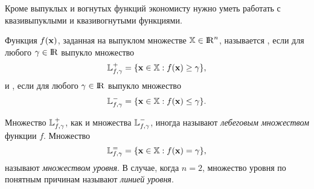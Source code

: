     Кроме выпуклых и вогнутых функций экономисту нужно уметь работать с квазивыпуклыми и
    квазивогнутыми функциями.


\begin{dfn}
 Функция $f(\mathbf{x})$, заданная на выпуклом множестве $\mathbb{X} \in
  {\rm I\!R}^n$, называется ,
  если для любого $\gamma \in {\rm I\!R}$ выпукло множество
\[
    \mathbb{L}^{+}_{f,\gamma}=\{ \mathbf{x}\in\mathbb{X}: f(\mathbf{x}) \geq \gamma\},
\]
    и ,
  если для любого $\gamma \in {\rm I\!R}$ выпукло множество
\[
    \mathbb{L}^{-}_{f,\gamma}= \{ \mathbf{x}\in\mathbb{X}: f(\mathbf{x}) \leq \gamma \}.
\]
\end{dfn}

    Множество $\mathbb{L}^{+}_{f,\gamma}$, как и множества $\mathbb{L}^{-}_{f,\gamma}$,
    иногда называют \emph{лебеговым множеством} функции $f$. Множество
\[
    \mathbb{L}^{=}_{f,\gamma}= \{ \mathbf{x}\in\mathbb{X}: f(\mathbf{x})=\gamma \},
\]
    называют \emph{множеством уровня}. В случае, когда $n=2$,
    множество уровня по понятным причинам называют \emph{линией уровня}.



